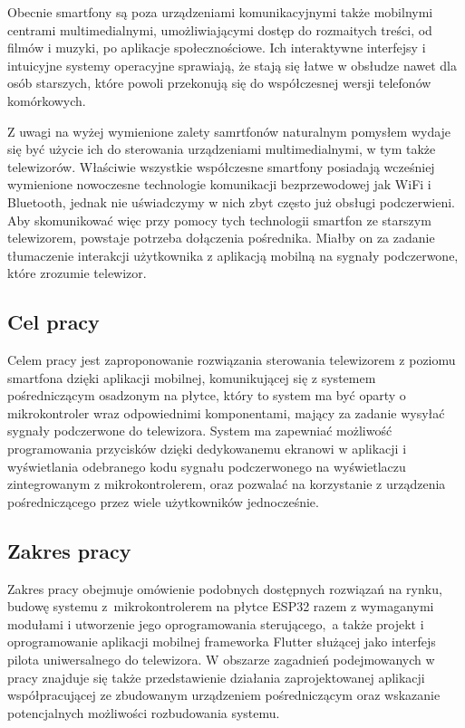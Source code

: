 \documentclass[12pt,twoside,draft]{article}
\begin{document}
Obecnie smartfony są poza urządzeniami komunikacyjnymi także mobilnymi centrami multimedialnymi,
umożliwiającymi dostęp do rozmaitych treści, od filmów i muzyki, po aplikacje społecznościowe.
Ich interaktywne interfejsy i intuicyjne systemy operacyjne sprawiają, że stają się łatwe w obsłudze nawet dla osób starszych,
które powoli przekonują się do współczesnej wersji telefonów komórkowych.

Z uwagi na wyżej wymienione zalety samrtfonów naturalnym pomysłem wydaje się być użycie ich do
sterowania urządzeniami multimedialnymi, w tym także telewizorów. Właściwie wszystkie współczesne smartfony posiadają
wcześniej wymienione nowoczesne technologie komunikacji bezprzewodowej jak WiFi i Bluetooth, jednak nie uświadczymy w nich zbyt często już obsługi podczerwieni. Aby skomunikować więc przy pomocy tych technologii smartfon
ze starszym telewizorem, powstaje potrzeba dołączenia pośrednika. Miałby on za zadanie tłumaczenie interakcji
użytkownika z aplikacją mobilną na sygnały podczerwone, które zrozumie telewizor.

\subsection{Cel pracy}
Celem pracy jest zaproponowanie rozwiązania sterowania telewizorem z poziomu
smartfona dzięki aplikacji mobilnej, komunikującej się z systemem pośredniczącym osadzonym na  płytce, który to system ma być oparty o mikrokontroler wraz odpowiednimi komponentami, mający za zadanie wysyłać sygnały podczerwone do telewizora. System ma zapewniać możliwość programowania przycisków dzięki dedykowanemu ekranowi w aplikacji i
wyświetlania odebranego kodu sygnału podczerwonego na wyświetlaczu zintegrowanym z mikrokontrolerem, oraz pozwalać na korzystanie z urządzenia pośredniczącego przez wiele użytkowników jednocześnie.

\subsection{Zakres pracy}
Zakres pracy obejmuje omówienie podobnych dostępnych rozwiązań na rynku, budowę systemu z~mikrokontrolerem na płytce ESP32 razem z wymaganymi modułami i utworzenie jego oprogramowania sterującego,~a także projekt i oprogramowanie aplikacji
mobilnej frameworka Flutter służącej jako interfejs pilota uniwersalnego do telewizora. W obszarze zagadnień podejmowanych w pracy znajduje się także przedstawienie działania zaprojektowanej aplikacji współpracującej ze zbudowanym urządzeniem pośredniczącym oraz wskazanie potencjalnych możliwości rozbudowania systemu.
\end{document}
